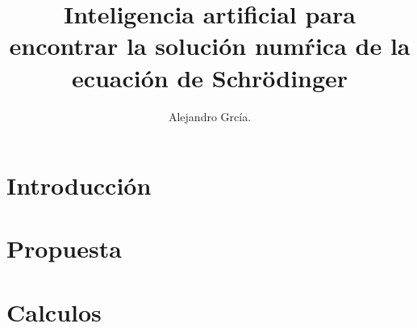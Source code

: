 \documentclass[]{rmf-d}
\begin{document}
	\title{Inteligencia artificial para encontrar la soluci\'on num\'rica de la ecuaci\'on de Schr\"odinger
	\vspace{-6pt}}

	\author{Alejandro Grcía.}
	\address{TNM\\
		TESOEM}


	\maketitle {} %


	\begin{resumen}
		
	\end{resumen}
	\begin{abstract}
		
	\end{abstract}
	 
	\begin{multicols}{2}
		\section{Introducci\'on}
			
		\section{Propuesta}
			
		\section{Calculos}
			
	\end{multicols}
	\medline
	\begin{multicols}{2}
		\begin{thebibliography}{99}
		\end{thebibliography}
	\end{multicols}
\end{document}
